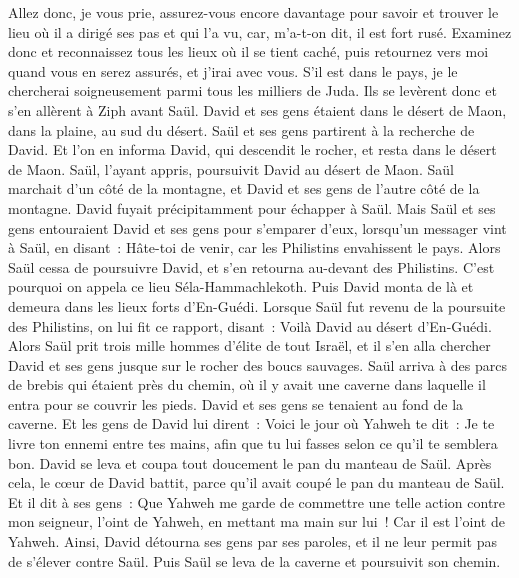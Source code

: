 \begin{multicols}{2}
Allez donc, je vous prie, assurez-vous encore davantage pour savoir et trouver le lieu où il a dirigé ses pas et qui l'a vu, car, m'a-t-on dit, il est fort rusé.
Examinez donc et reconnaissez tous les lieux où il se tient caché, puis retournez vers moi quand vous en serez assurés, et j'irai avec vous. S'il est dans le pays, je le chercherai soigneusement parmi tous les milliers de Juda.
Ils se levèrent donc et s'en allèrent à Ziph avant Saül. David et ses gens étaient dans le désert de Maon, dans la plaine, au sud du désert.
Saül et ses gens partirent à la recherche de David. Et l'on en informa David, qui descendit le rocher, et resta dans le désert de Maon. Saül, l'ayant appris, poursuivit David au désert de Maon.
Saül marchait d'un côté de la montagne, et David et ses gens de l'autre côté de la montagne. David fuyait précipitamment pour échapper à Saül. Mais Saül et ses gens entouraient David et ses gens pour s'emparer d'eux,
lorsqu'un messager vint à Saül, en disant~: Hâte-toi de venir, car les Philistins envahissent le pays.
Alors Saül cessa de poursuivre David, et s'en retourna au-devant des Philistins. C'est pourquoi on appela ce lieu Séla-Hammachlekoth.
\VerseOne{}Puis David monta de là et demeura dans les lieux forts d'En-Guédi.
Lorsque Saül fut revenu de la poursuite des Philistins, on lui fit ce rapport, disant~: Voilà David au désert d'En-Guédi.
Alors Saül prit trois mille hommes d'élite de tout Israël, et il s'en alla chercher David et ses gens jusque sur le rocher des boucs sauvages.
Saül arriva à des parcs de brebis qui étaient près du chemin, où il y avait une caverne dans laquelle il entra pour se couvrir les pieds. David et ses gens se tenaient au fond de la caverne.
Et les gens de David lui dirent~: Voici le jour où Yahweh te dit~: Je te livre ton ennemi entre tes mains, afin que tu lui fasses selon ce qu'il te semblera bon. David se leva et coupa tout doucement le pan du manteau de Saül.
Après cela, le cœur de David battit, parce qu'il avait coupé le pan du manteau de Saül.
Et il dit à ses gens~: Que Yahweh me garde de commettre une telle action contre mon seigneur, l'oint de Yahweh, en mettant ma main sur lui~! Car il est l'oint de Yahweh.
Ainsi, David détourna ses gens par ses paroles, et il ne leur permit pas de s'élever contre Saül. Puis Saül se leva de la caverne et poursuivit son chemin.

\end{multicols}
